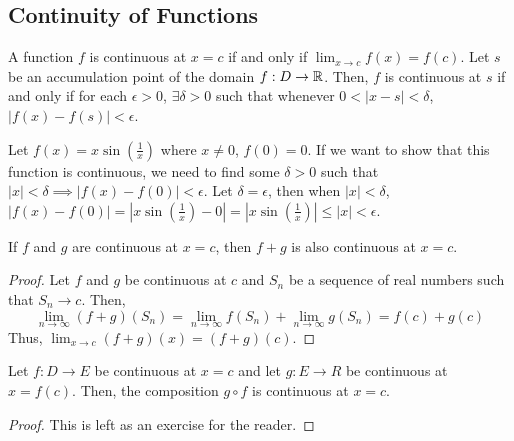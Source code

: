 \subsection{Continuity of Functions}
\begin{definition}
    A function $f$ is continuous at $x = c$ if and only if $\lim_{x \to c} f(x) = f(c)$. Let $s$ be an accumulation point of the domain $f:D \to \mathbb{R}$. Then, $f$ is continuous at $s$ if and only if for each $\epsilon > 0$, $\exists \delta > 0$ such that whenever $0 < |x - s| < \delta$, $|f(x) - f(s)| < \epsilon$.
\end{definition}
\begin{note}
    Let $f(x) = x\sin(\frac{1}{x})$ where $x \neq 0$, $f(0) = 0$. If we want to show that this function is continuous, we need to find some $\delta > 0$ such that $|x| < \delta \implies |f(x) - f(0)| < \epsilon$. Let $\delta = \epsilon$, then when $|x| < \delta$, $|f(x) - f(0)| = |x\sin(\frac{1}{x}) - 0| = |x\sin(\frac{1}{x})| \leq |x| < \epsilon$.
\end{note}

\begin{theorem}{}{}
    If $f$ and $g$ are continuous at $x = c$, then $f + g$ is also continuous at $x = c$.
\end{theorem}
\begin{proof}
    Let $f$ and $g$ be continuous at $c$ and $S_n$ be a sequence of real numbers such that $S_n \to c$. Then, $$\lim_{n \to \infty} (f + g)(S_n) = \lim_{n \to \infty} f(S_n) + \lim_{n \to \infty} g(S_n) = f(c) + g(c)$$ Thus, $\lim_{x \to c} (f + g)(x) = (f + g)(c)$.
\end{proof}

\begin{theorem}{}{}
    Let $f:D \to E$ be continuous at $x = c$ and let $g:E \to R$ be continuous at $x = f(c)$. Then, the composition $g \circ f$ is continuous at $x = c$.
\end{theorem}
\begin{proof}
    This is left as an exercise for the reader.
\end{proof}